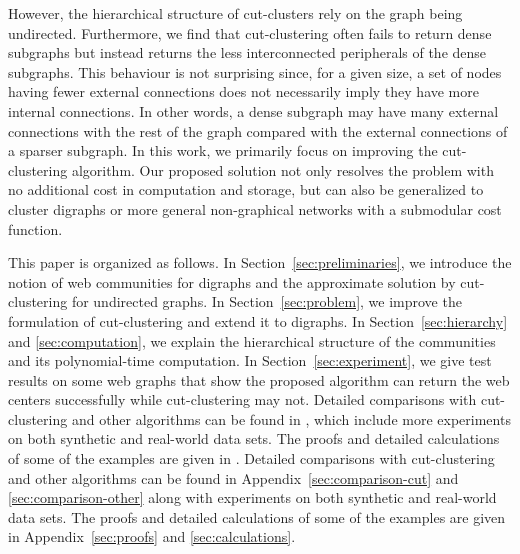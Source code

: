 However, the hierarchical structure of cut-clusters rely on the graph being undirected. Furthermore,
we find that cut-clustering often fails to return dense subgraphs but instead returns the less
interconnected peripherals of the dense subgraphs. This behaviour is not surprising since, for a given
size, a set of nodes having fewer external connections does not necessarily imply they have more
internal connections. In other words, a dense subgraph may have many external connections
with the rest of the graph compared with the external connections of a sparser subgraph.
In this work, we primarily focus on improving the cut-clustering algorithm. Our proposed solution
not only resolves the problem with no additional cost in computation and storage, but can also be
generalized to cluster digraphs or more general non-graphical networks with a submodular cost
function. 

This paper is organized as follows. In Section~\ref{sec:preliminaries}, we introduce the notion of web communities for digraphs and the approximate solution by cut-clustering for undirected graphs. In Section~\ref{sec:problem}, we improve the formulation of cut-clustering and extend it to digraphs. In  Section~\ref{sec:hierarchy} and \ref{sec:computation}, we explain the hierarchical structure of the communities and its polynomial-time computation. In Section~\ref{sec:experiment}, we give test results on some web graphs that show the proposed algorithm can return the web centers successfully while cut-clustering may not. 
\ifPAGELIMIT
Detailed comparisons with cut-clustering and other algorithms can be found in \cite[Appendix~A and B]{long}, which include more experiments on both synthetic and real-world data sets. The proofs and detailed calculations of some of the examples are given in \cite[Appendix~C and D]{long}.
\else Detailed comparisons with cut-clustering and other algorithms can be found in Appendix~\ref{sec:comparison-cut} and \ref{sec:comparison-other} along with experiments on both synthetic and real-world data sets. The proofs and detailed calculations of some of the examples are given in Appendix~\ref{sec:proofs} and \ref{sec:calculations}.
\fi